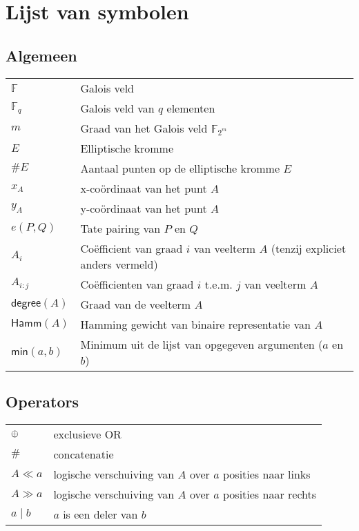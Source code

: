 \chapter*{Lijst van symbolen}

\section*{Algemeen}

\begin{tabular}{l@{$\qquad$}l}
$\mathbb{F}$	& Galois veld\\
$\mathbb{F}_q$	& Galois veld van $q$ elementen\\
$m$				& Graad van het Galois veld $\mathbb{F}_{2^m}$\\
$E$				& Elliptische kromme\\
$\#E$				& Aantaal punten op de elliptische kromme $E$\\
$x_A$				& x-co\"ordinaat van het punt $A$\\
$y_A$				& y-co\"ordinaat van het punt $A$\\
$e(P, Q)$		& Tate pairing van $P$ en $Q$\\
$A_i$				& Co\"efficient van graad $i$ van veelterm $A$ (tenzij expliciet anders vermeld)\\
$A_{i:j}$				& Co\"efficienten van graad $i$ t.e.m. $j$ van veelterm $A$\\
$\textsf{degree}(A)$	& Graad van de veelterm $A$\\
$\textsf{Hamm}(A)$	& Hamming gewicht van binaire representatie van $A$\\
$\textsf{min}(a, b)$	& Minimum  uit de lijst van opgegeven argumenten ($a$ en $b$)\\
\end{tabular}

\section*{Operators}

\begin{tabular}{l@{$\qquad$}l}
$\oplus$	& exclusieve OR\\
$\#$		& concatenatie\\
$A \ll a$	& logische verschuiving van $A$ over $a$ posities naar links\\
$A \gg a$	& logische verschuiving van $A$ over $a$ posities naar rechts\\
$a \mid b$	& $a$ is een deler van $b$\\
\end{tabular}
